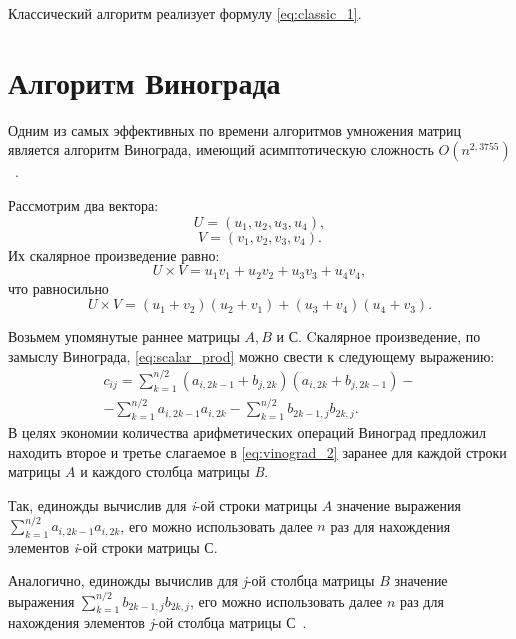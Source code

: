 Классический алгоритм реализует формулу \ref{eq:classic_1}.

\section{Алгоритм Винограда}
Одним из самых эффективных по времени алгоритмов умножения матриц является алгоритм Винограда, имеющий асимптотическую сложность $O(n^{2,3755})$~\cite{vinograd-haskell}.

Рассмотрим два вектора:
\begin{equation}
    U = (u_{1}, u_{2}, u_{3}, u_{4}),
\end{equation}
\begin{equation}
    V = (v_{1}, v_{2}, v_{3}, v_{4}).
\end{equation}
Их скалярное произведение равно:
\begin{equation}
    \label{eq:scalar_prod}
    U \times V = u_{1}v_{1} + u_{2}v_{2} + u_{3}v_{3} + u_{4}v_{4},
\end{equation}
что равносильно
\begin{equation}
    \label{eq:vinograd_1}
    U \times V = (u_{1} + v_{2})(u_{2} + v_{1}) + (u_{3} + v_{4})(u_{4} + v_{3}).
\end{equation}

Возьмем упомянутые раннее матрицы $A, B$ и $С$. Cкалярное произведение, по замыслу Винограда, \ref{eq:scalar_prod} можно свести к следующему выражению:
\begin{multline}
    \label{eq:vinograd_2}
    c_{ij} = \sum_{k = 1}^{n / 2}(a_{i,2k - 1} + b_{j, 2k})(a_{i,2k} + b_{j, 2k - 1}) - \\ - \sum_{k = 1}^{n / 2}a_{i,2k - 1}a_{i,2k} - \sum_{k = 1}^{n / 2}b_{2k - 1,j}b_{2k,j}.
\end{multline}
В целях экономии количества арифметических операций Виноград предложил находить второе и третье слагаемое в \ref{eq:vinograd_2} заранее для каждой строки матрицы $A$ и каждого столбца матрицы \textit{B}.

Так, единожды вычислив для \textit{i}-ой строки матрицы $A$ значение выражения $\sum_{k = 1}^{n / 2}a_{i,2k - 1}a_{i,2k}$, его можно использовать далее $n$ раз для нахождения элементов \textit{i}-ой строки матрицы $С$.  

Аналогично, единожды вычислив для \textit{j}-ой столбца матрицы $B$ значение выражения $\sum_{k = 1}^{n / 2}b_{2k - 1,j}b_{2k,j}$, его можно использовать далее $n$ раз для нахождения элементов \textit{j}-ой столбца матрицы $С$~\cite{vinograd-alg}.

